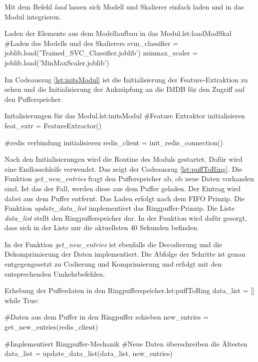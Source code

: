 Mit dem Befehl \textit{load} lassen sich Modell und Skalierer einfach laden und in das Modul integrieren. 

\begin{pythoncode}{Laden der Elemente aus dem Modellaufbau in das Modul.}{lst:loadModSkal}
#Laden des Modells und des Skalierers
svm_classifier = joblib.load('Trained_SVC_Classifier.joblib') 
minmax_scaler = joblib.load('MinMaxScaler.joblib')
\end{pythoncode}

Im Codeauszug \ref{lst:initsModul} ist die Initialisierung der Feature-Extraktion zu sehen und die Initialisierung der Anknüpfung an die IMDB für den Zugriff auf den Pufferspeicher. 

\begin{pythoncode}{Initalisierungen für das Modul.}{lst:initsModul}
#Feature Extraktor initialisieren
feat_extr = FeatureExtractor()

#redis verbindung initialisieren
redis_client = init_redis_connection()
\end{pythoncode}

Nach den Initialisierungen wird die Routine des Moduls gestartet. Dafür wird eine Endlosschleife verwendet. Das zeigt der Codeauszug \ref{lst:puffToRing}. Die Funktion \textit{get\_new\_entries} fragt den Pufferspeicher ab, ob neue Daten vorhanden sind. Ist das der Fall, werden diese aus dem Puffer geladen. Der Eintrag wird dabei aus dem Puffer entfernt. Das Laden erfolgt nach dem FIFO Prinzip. Die Funktion \textit{update\_data\_list} implementiert das Ringpuffer-Prinzip. Die Liste \textit{data\_list} stellt den Ringpufferspeicher dar. In der Funktion wird dafür gesorgt, dass sich in der Liste nur die aktuellsten 40 Sekunden befinden.  \par

In der Funktion \textit{get\_new\_entries} ist ebenfalls die Decodierung und die Dekomprimierung der Daten implementiert. Die Abfolge der Schritte ist genau entgegengesetzt zu Codierung und Komprimierung und erfolgt mit den entsprechenden Umkehrbefehlen.

\begin{pythoncode}{Erhebung der Pufferdaten in den Ringpufferspeicher.}{lst:puffToRing}
data_list = []
while True:

    #Daten aus dem Puffer in den Ringpuffer schieben
    new_entries = get_new_entries(redis_client)

    #Implementiert Ringpuffer-Mechanik
    #Neue Daten überschreiben die Ältesten
    data_list = update_data_list(data_list, new_entries)
\end{pythoncode}

